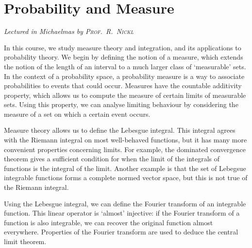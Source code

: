 \chapter[Probability and Measure \\ \textnormal{\emph{Lectured in Michaelmas \oldstylenums{2022} by \textsc{Prof.\ R.\ Nickl}}}]{Probability and Measure}
\emph{\Large Lectured in Michaelmas  by \textsc{Prof.\ R.\ Nickl}}

In this course, we study measure theory and integration, and its applications to probability theory.
We begin by defining the notion of a measure, which extends the notion of the length of an interval to a much larger class of `measurable' sets.
In the context of a probability space, a probability measure is a way to associate probabilities to events that could occur.
Measures have the countable additivity property, which allows us to compute the measure of certain limits of measurable sets.
Using this property, we can analyse limiting behaviour by considering the measure of a set on which a certain event occurs.

Measure theory allows us to define the Lebesgue integral.
This integral agrees with the Riemann integral on most well-behaved functions, but it has many more convenient properties concerning limits.
For example, the dominated convergence theorem gives a sufficient condition for when the limit of the integrals of functions is the integral of the limit.
Another example is that the set of Lebegsue integrable functions forms a complete normed vector space, but this is not true of the Riemann integral.

Using the Lebesgue integral, we can define the Fourier transform of an integrable function.
This linear operator is `almost' injective: if the Fourier transform of a function is also integrable, we can recover the original function almost everywhere.
Properties of the Fourier transform are used to deduce the central limit theorem.


